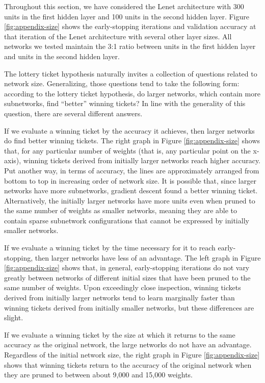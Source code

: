 Throughout this section, we have considered the Lenet architecture with 300 units in the first hidden layer and 100 units in the second hidden layer.
Figure \ref{fig:appendix-size} shows the early-stopping iterations and validation accuracy at that iteration of the Lenet architecture with several other layer sizes. All
networks we tested maintain the 3:1 ratio between units in the first hidden layer and units in the second hidden layer.

The lottery ticket hypothesis naturally invites a collection of questions related to network size. Generalizing, those questions tend to take the following
form: according to the lottery ticket hypothesis, do larger networks, which contain more subnetworks, find ``better'' winning tickets? In line with the
generality of this question, there are several different answers.

If we evaluate a winning ticket by the accuracy it achieves, then larger networks do find
better winning tickets. The right graph in Figure \ref{fig:appendix-size} shows that, for any particular number of weights (that is, any particular
point on the x-axis), winning tickets derived from initially larger networks reach higher accuracy. Put another way, in terms of accuracy, the lines
are approximately arranged from bottom to top in increasing order of network size. It is possible that, since larger networks have more subnetworks,
gradient descent found a better winning ticket. Alternatively, the initially larger networks have more units even when pruned to the same number of weights
as smaller networks, meaning they are able to contain sparse subnetwork configurations that cannot be expressed by initially smaller networks.

If we evaluate a winning ticket by the time necessary for it to reach early-stopping, then larger networks have less of an advantage. The left graph in Figure \ref{fig:appendix-size}
shows that, in general, early-stopping iterations do not vary greatly between networks of different initial sizes that have been pruned to the same number of weights. 
Upon exceedingly close inspection, winning tickets derived from initially larger networks tend to learn marginally faster than winning tickets derived from
initially smaller networks, but these differences are slight.

If we evaluate a winning ticket by the size at which it returns to the same accuracy as the original network, the large networks do not have an advantage.
Regardless of the initial network size, the right graph in Figure \ref{fig:appendix-size} shows that winning tickets return to the accuracy of the original network
when they are pruned to between about 9,000 and 15,000 weights.
